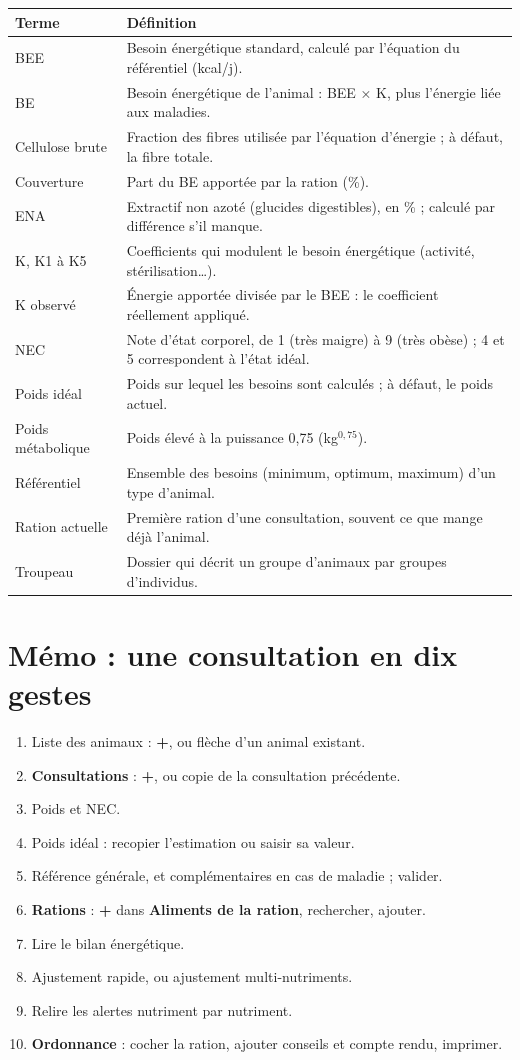 \documentclass[11pt,a4paper]{article}
\newcommand{\ui}[1]{\textsf{\textbf{#1}}}
\begin{document}
\begin{tabularx}{\linewidth}{@{}l X@{}}
\toprule
\textbf{Terme} & \textbf{Définition} \\
\midrule
BEE & Besoin énergétique standard, calculé par l'équation du référentiel (kcal/j). \\
BE & Besoin énergétique de l'animal : BEE × K, plus l'énergie liée aux maladies. \\
Cellulose brute & Fraction des fibres utilisée par l'équation d'énergie ; à défaut, la fibre totale. \\
Couverture & Part du BE apportée par la ration (\%). \\
ENA & Extractif non azoté (glucides digestibles), en \% ; calculé par différence s'il manque. \\
K, K1 à K5 & Coefficients qui modulent le besoin énergétique (activité, stérilisation\ldots). \\
K observé & Énergie apportée divisée par le BEE : le coefficient réellement appliqué. \\
NEC & Note d'état corporel, de 1 (très maigre) à 9 (très obèse) ; 4 et 5 correspondent à l'état idéal. \\
Poids idéal & Poids sur lequel les besoins sont calculés ; à défaut, le poids actuel. \\
Poids métabolique & Poids élevé à la puissance 0,75 (kg$^{0,75}$). \\
Référentiel & Ensemble des besoins (minimum, optimum, maximum) d'un type d'animal. \\
Ration actuelle & Première ration d'une consultation, souvent ce que mange déjà l'animal. \\
Troupeau & Dossier qui décrit un groupe d'animaux par groupes d'individus. \\
\bottomrule
\end{tabularx}

\section{Mémo : une consultation en dix gestes}

\begin{enumerate}
  \item Liste des animaux : \ui{+}, ou flèche d'un animal existant.
  \item \ui{Consultations} : \ui{+}, ou copie de la consultation précédente.
  \item Poids et NEC.
  \item Poids idéal : recopier l'estimation ou saisir sa valeur.
  \item Référence générale, et complémentaires en cas de maladie ; valider.
  \item \ui{Rations} : \ui{+} dans \ui{Aliments de la ration}, rechercher, ajouter.
  \item Lire le bilan énergétique.
  \item Ajustement rapide, ou ajustement multi-nutriments.
  \item Relire les alertes nutriment par nutriment.
  \item \ui{Ordonnance} : cocher la ration, ajouter conseils et compte rendu, imprimer.
\end{enumerate}
\end{document}
